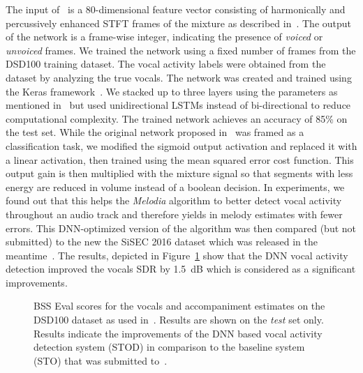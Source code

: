 The input of~\cite{Leglaive15} is a 80-dimensional feature vector consisting of harmonically and percussively enhanced STFT frames of the mixture as described in~\cite{ono08}.
The output of the network is a frame-wise integer, indicating the presence of \emph{voiced} or \emph{unvoiced} frames.
We trained the network using a fixed number of frames from the DSD100 training dataset.
The vocal activity labels were obtained from the dataset by analyzing the true vocals.
The network was created and trained using the Keras framework~\cite{chollet15}.
We stacked up to three layers using the parameters as mentioned in~\cite{Leglaive15} but used unidirectional LSTMs instead of bi-directional to reduce computational complexity.
The trained network achieves an accuracy of 85\% on the test set.
While the original network proposed in~\cite{Leglaive15} was framed as a classification task, we modified the sigmoid output activation and replaced it with a linear activation, then trained using the mean squared error cost function.
This output gain is then multiplied with the mixture signal so that segments with less energy are reduced in volume instead of a boolean decision.
In experiments, we found out that this helps the \emph{Melodia} algorithm to better detect vocal activity throughout an audio track and therefore yields in melody estimates with fewer errors.
This DNN-optimized version of the algorithm was then compared (but not submitted) to the new the SiSEC 2016 dataset which was released in the meantime~\cite{liutkus17}.
The results, depicted in Figure~\ref{fig:05_comparison_sto_stodnn} show that the DNN vocal activity detection improved the vocals SDR by 1.5~dB which is considered as a significant improvements.

\begin{figure}
  \centering
  
  \caption{BSS Eval scores for the vocals and accompaniment estimates on the DSD100 dataset as used in~\cite{liutkus17}. Results are shown on the \emph{test} set only. Results indicate the improvements of the DNN based vocal activity detection system (\textsc{STOD}) in comparison to the baseline system (\textsc{STO}) that was submitted to~\cite{ono15}.}
  \label{fig:05_comparison_sto_stodnn}
\end{figure}

